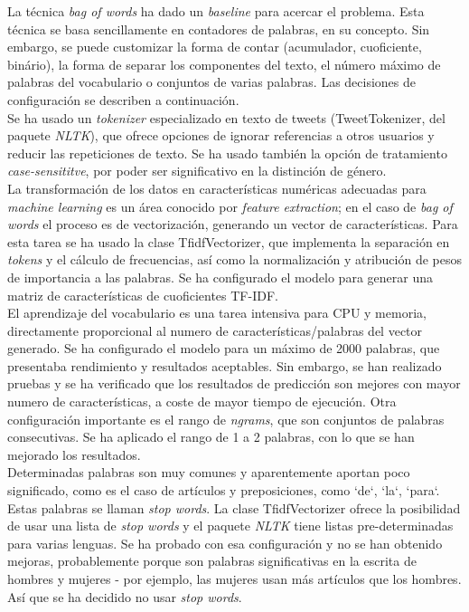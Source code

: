 \documentclass[11pt,a4paper]{article}
\begin{document}
  \indent La t\'ecnica {\em bag of words} ha dado un {\em baseline} para acercar el problema. Esta t\'ecnica se basa sencillamente en contadores de palabras, en su concepto. Sin embargo, se puede customizar la forma de contar (acumulador, cuoficiente, bin\'ario), la forma de separar los componentes del texto, el n\'umero m\'aximo de palabras del vocabulario o conjuntos de varias palabras. Las decisiones de configuraci\'on se describen a continuaci\'on.\\
  \indent Se ha usado un {\em tokenizer} especializado en texto de tweets ({\ttfamily TweetTokenizer}, del paquete {\em NLTK}), que ofrece opciones de ignorar referencias a otros usuarios y reducir las repeticiones de texto. Se ha usado tambi\'en la opci\'on de tratamiento {\em case-sensititve}, por poder ser significativo en la distinci\'on de g\'enero.\\
  \indent La transformaci\'on de los datos en caracter\'isticas num\'ericas adecuadas para {\em machine learning} es un \'area conocido por {\em feature extraction}; en el caso de {\em bag of words} el proceso es de vectorizaci\'on, generando un vector de caracter\'isticas. Para esta tarea se ha usado la clase {\ttfamily TfidfVectorizer}, que implementa la separaci\'on en {\em tokens} y el c\'alculo de frecuencias, así como la normalizaci\'on y atribuci\'on de pesos de importancia a las palabras. Se ha configurado el modelo para generar una matriz de caracter\'isticas de cuoficientes TF-IDF.\\
  \indent El aprendizaje del vocabulario es una tarea intensiva para CPU y memoria, directamente proporcional al numero de caracter\'isticas/palabras del vector generado. Se ha configurado el modelo para un m\'aximo de 2000 palabras, que presentaba rendimiento y resultados aceptables. Sin embargo, se han realizado pruebas y se ha verificado que los resultados de predicci\'on son mejores con mayor numero de caracter\'isticas, a coste de mayor tiempo de ejecuci\'on. Otra configuraci\'on importante es el rango de {\em ngrams}, que son conjuntos de palabras consecutivas. Se ha aplicado el rango de 1 a 2 palabras, con lo que se han mejorado los resultados.\\
  \indent Determinadas palabras son muy comunes y aparentemente aportan poco significado, como es el caso de art\'iculos y preposiciones, como `de`, `la`, `para`. Estas palabras se llaman {\em stop words}. La clase {\ttfamily TfidfVectorizer} ofrece la posibilidad de usar una lista de {\em stop words} y el paquete {\em NLTK} tiene listas pre-determinadas para varias lenguas.  Se ha probado con esa configuraci\'on y no se han obtenido mejoras, probablemente porque son palabras significativas en la escrita de hombres y mujeres - por ejemplo, las mujeres usan m\'as art\'iculos que los hombres. As\'i que se ha decidido no usar {\em stop words}.
  
\end{document}
